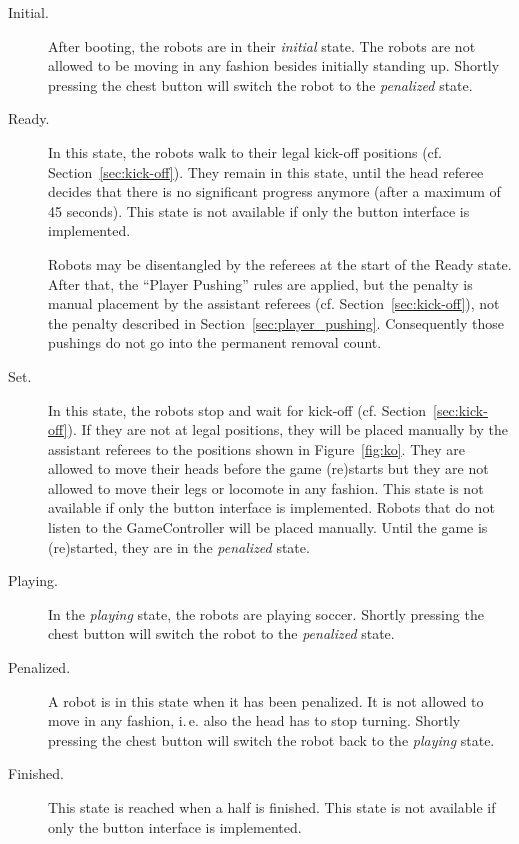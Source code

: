 \documentclass[12pt]{article}
\newcommand{\ie}{\mbox{i.\,e.}\xspace}
\newcommand{\cf}{\mbox{cf.}\xspace}
\newcommand{\KickOffAutoTime}{45 seconds\xspace}
\begin{document}
\begin{description}

\item[Initial.] After booting, the robots are in their \emph{initial} state. The robots are not allowed to be moving in any fashion besides initially standing up. Shortly pressing the chest button will switch the robot to the \emph{penalized} state.

\item[Ready.] In this state, the robots walk to their legal kick-off positions (\cf Section~\ref{sec:kick-off}). They remain in this state, until the head referee decides that there is no significant progress anymore (after a maximum of \KickOffAutoTime). This state is not available if only the button interface is implemented.

Robots may be disentangled by the referees at the start of the Ready state. After that, 
the ``Player Pushing'' rules are applied, but the penalty is manual placement by the assistant referees (\cf Section~\ref{sec:kick-off}), not the penalty described in Section~\ref{sec:player_pushing}.
Consequently those pushings do not go into the permanent removal count.

\item[Set.] In this state, the robots stop and wait for kick-off (\cf Section~\ref{sec:kick-off}). If they are not at legal positions, they will be placed manually by the assistant referees to the positions shown in Figure~\ref{fig:ko}. They are allowed to move their heads before the game (re)starts but they are not allowed to move their legs or locomote in any fashion. This state is not available if only the button interface is implemented. Robots that do not listen to the GameController will be placed manually. Until the game is (re)started, they are in the \emph{penalized} state.

\item[Playing.] In the \emph{playing} state, the robots are playing soccer. Shortly pressing the chest button will switch the robot to the \emph{penalized} state.

\item[Penalized.] A robot is in this state when it has been penalized. It is not allowed to move in any fashion, \ie also the head has to stop turning. Shortly pressing the chest button will switch the robot back to the \emph{playing} state.

\item[Finished.] This state is reached when a half is finished. This state is not available if only the button interface is implemented.

\end{description}
\end{document}
